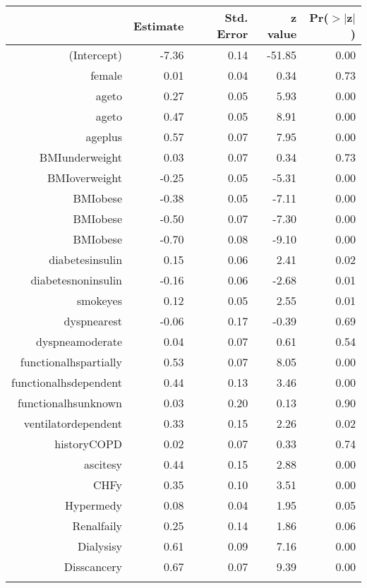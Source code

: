 \bigskip\bigskip
\centering
\begin{tabular}{rrrrr}
  \hline
 & Estimate & Std. Error & z value & Pr($>$$|$z$|$) \\ 
  \hline
(Intercept) & -7.36 & 0.14 & -51.85 & 0.00 \\ 
  female & 0.01 & 0.04 & 0.34 & 0.73 \\ 
  age\-65\-to\-74 & 0.27 & 0.05 & 5.93 & 0.00 \\ 
  age\-75\-to\-84 & 0.47 & 0.05 & 8.91 & 0.00 \\ 
  age\-85\-plus & 0.57 & 0.07 & 7.95 & 0.00 \\ 
  BMI\-underweight & 0.03 & 0.07 & 0.34 & 0.73 \\ 
  BMI\-overweight & -0.25 & 0.05 & -5.31 & 0.00 \\ 
  BMI\-obese\-1 & -0.38 & 0.05 & -7.11 & 0.00 \\ 
  BMI\-obese\-2 & -0.50 & 0.07 & -7.30 & 0.00 \\ 
  BMI\-obese\-3 & -0.70 & 0.08 & -9.10 & 0.00 \\ 
  diabetes\-insulin & 0.15 & 0.06 & 2.41 & 0.02 \\ 
  diabetes\-noninsulin & -0.16 & 0.06 & -2.68 & 0.01 \\ 
  smoke\-yes & 0.12 & 0.05 & 2.55 & 0.01 \\ 
  dyspnea\-rest & -0.06 & 0.17 & -0.39 & 0.69 \\ 
  dyspnea\-moderate & 0.04 & 0.07 & 0.61 & 0.54 \\ 
  functional\-hs\-partially & 0.53 & 0.07 & 8.05 & 0.00 \\ 
  functional\-hs\-dependent & 0.44 & 0.13 & 3.46 & 0.00 \\ 
  functional\-hs\-unknown & 0.03 & 0.20 & 0.13 & 0.90 \\ 
  ventilator\-dependent & 0.33 & 0.15 & 2.26 & 0.02 \\ 
  history\-COPD & 0.02 & 0.07 & 0.33 & 0.74 \\ 
  ascites\-y & 0.44 & 0.15 & 2.88 & 0.00 \\ 
  CHF\-y & 0.35 & 0.10 & 3.51 & 0.00 \\ 
  Hyper\-med\-y & 0.08 & 0.04 & 1.95 & 0.05 \\ 
  Renal\-fail\-y & 0.25 & 0.14 & 1.86 & 0.06 \\ 
  Dialysis\-y & 0.61 & 0.09 & 7.16 & 0.00 \\ 
  Diss\-cancer\-y & 0.67 & 0.07 & 9.39 & 0.00 \\ 
$$
\end{tabular}
